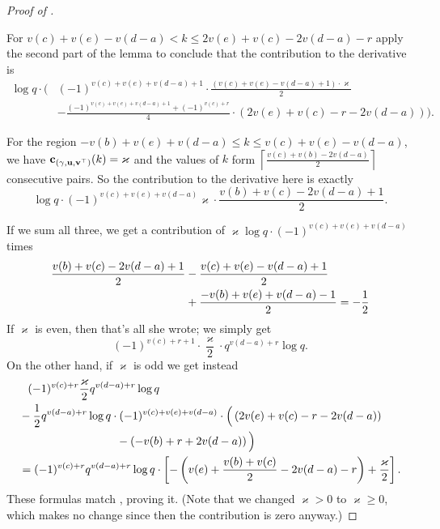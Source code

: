 \begin{proof}[Proof of ]
\begin{itemize}
  \ii For $v(c)+v(e)-v(d-a) < k \le 2v(e)+v(c)-2v(d-a)-r$
  apply the second part of the lemma to conclude that the contribution to the derivative is
  \begin{align*}
    \log q \cdot \Big( & (-1)^{v(c)+v(e)+v(d-a)+1} \cdot
      \frac{(v(c)+v(e)-v(d-a)+1) \cdot \varkappa}{2} \\
      &
      - \frac{(-1)^{v(c)+v(e)+v(d-a)+1} + (-1)^{v(c)+r}}{4} \cdot (2v(e)+v(c)-r-2v(d-a))
    \Big).
  \end{align*}

  \ii For the region $-v(b)+v(e)+v(d-a) \le k \le v(c)+v(e)-v(d-a)$,
  we have $\mathbf c_{{(\gamma, \mathbf u, \mathbf v^\top)}}(k) = \varkappa$
  and the values of $k$ form $\left\lceil \frac{v(c)+v(b)-2v(d-a)}{2} \right\rceil$ consecutive pairs.
  So the contribution to the derivative here is exactly
  \[ \log q \cdot (-1)^{v(c)+v(e)+v(d-a)} \varkappa \cdot \frac{v(b)+v(c)-2v(d-a)+1}{2}. \]
\end{itemize}
If we sum all three,
we get a contribution of $\varkappa \log q \cdot  (-1)^{v(c)+v(e)+v(d-a)}$ times
\begin{align*}
  \frac{v(b)+v(c)-2v(d-a)+1}{2} &- \frac{v(c)+v(e)-v(d-a)+1}{2} \\
  &+ \frac{-v(b)+v(e)+v(d-a)-1}{2} = -\frac{1}{2}
\end{align*}
If $\varkappa$ is even, then that's all she wrote; we simply get
\[ (-1)^{v(c)+r+1} \cdot \frac{\varkappa}{2} \cdot q^{v(d-a)+r} \log q. \]
On the other hand, if $\varkappa$ is odd we get instead
\begin{align*}
  &\phantom+ (-1)^{v(c)+r} \frac{\varkappa}{2} q^{v(d-a)+r} \log q \\
  &- \half q^{v(d-a)+r} \log q \cdot (-1)^{v(c)+v(e)+v(d-a)} \cdot
    \Big( \left( 2v(e)+v(c)-r-2v(d-a)\right) \\
    &\hspace{20ex} - \left( -v(b)+r+2v(d-a) \right) \Big) \\
  &= (-1)^{v(c)+r} q^{v(d-a)+r} \log q \cdot \left[
    -\left( v(e)+\frac{v(b)+v(c)}{2}-2v(d-a)-r \right) + \frac{\varkappa}{2} \right].
\end{align*}
These formulas match , proving it.
(Note that we changed $\varkappa > 0$ to $\varkappa \ge 0$,
which makes no change since then the contribution is zero anyway.)
\end{proof}

